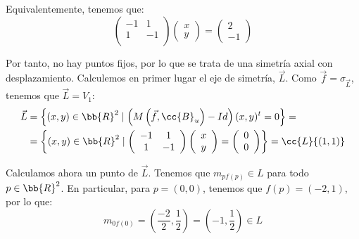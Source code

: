 \begin{ejercicio}
    Equivalentemente, tenemos que:
    \begin{equation*}
        \left(
        \begin{array}{cc}
            -1 & 1 \\
            1 & -1 \\
        \end{array}
        \right)
        \left(
        \begin{array}{c}
            x\\y
        \end{array}
        \right)
        =\left(
            \begin{array}{c}
                2 \\ -1
            \end{array}
        \right)
    \end{equation*}

    Por tanto, no hay puntos fijos, por lo que se trata de una simetría axial con desplazamiento. Calculemos en primer lugar el eje de simetría, $\vec{L}$.
    Como $\vec{f}= \sigma_{\vec{L}}$, tenemos que $\vec{L}=V_1$:
    \begin{align*}
        \vec{L}&= \left\{(x,y)\in \bb{R}^2 \mid \left(M\left(\vec{f}, \cc{B}_u\right) - Id\right)(x,y)^t = 0\right\} =\\
        &= \left\{(x,y)\in \bb{R}^2 \mid \left(
        \begin{array}{cc}
            -1 & 1 \\
            1 & -1 \\
        \end{array}
        \right)
        \left(
        \begin{array}{c}
            x\\y
        \end{array}
        \right)
        =\left(
            \begin{array}{c}
                0 \\ 0
            \end{array}
        \right)\right\} = \cc{L}\{(1,1)\}
    \end{align*}

    Calculamos ahora un punto de $\vec{L}$. Tenemos que $m_{p f(p)}\in L$ para todo $p\in \bb{R}^2$. En particular, para $p=(0,0)$, tenemos que $f(p)=(-2,1)$, por lo que:
    \begin{equation*}
        m_{0 f(0)} = \left(\frac{-2}{2},\frac{1}{2}\right) = \left(-1, \frac{1}{2}\right) \in L
    \end{equation*}


\end{ejercicio}
